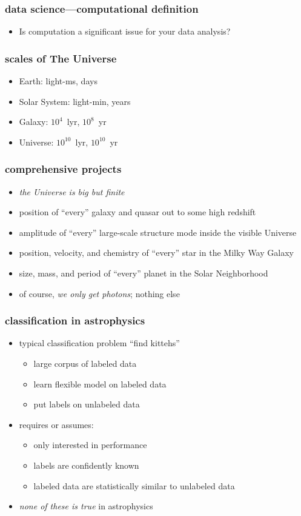 \documentclass[pdftex]{beamer}
\begin{document}
\begin{frame}
  \frametitle{data science---computational definition}
  \begin{itemize}
  \item Is computation a significant issue for your data analysis?
  \end{itemize}
\end{frame}

\begin{frame}
  \frametitle{scales of The Universe}
  \begin{itemize}
  \item Earth: light-ms, days
  \item Solar System: light-min, years
  \item Galaxy: $10^4$~lyr, $10^8$~yr
  \item Universe: $10^{10}$~lyr, $10^{10}$~yr
  \end{itemize}
\end{frame}

\begin{frame}
  \frametitle{comprehensive projects}
  \begin{itemize}
  \item \emph{the Universe is big but finite}
  \item<2-> position of ``every'' galaxy and quasar out to some high redshift
  \item<2-> amplitude of ``every'' large-scale structure mode inside the visible Universe
  \item<2-> position, velocity, and chemistry of ``every'' star in the Milky Way Galaxy
  \item<2-> size, mass, and period of ``every'' planet in the Solar Neighborhood
  \item<3> of course, \emph{we only get photons}; nothing else
  \end{itemize}
\end{frame}

\begin{frame}
  \frametitle{classification in astrophysics}
  \begin{itemize}
  \item typical classification problem ``find kittehs''
    \begin{itemize}
    \item large corpus of labeled data
    \item learn flexible model on labeled data
    \item put labels on unlabeled data
    \end{itemize}
  \item requires or assumes:
    \begin{itemize}
    \item only interested in performance
    \item labels are confidently known
    \item labeled data are statistically similar to unlabeled data
    \end{itemize}
  \item<2> \emph{none of these is true} in astrophysics
  \end{itemize}
\end{frame}
\end{document}
